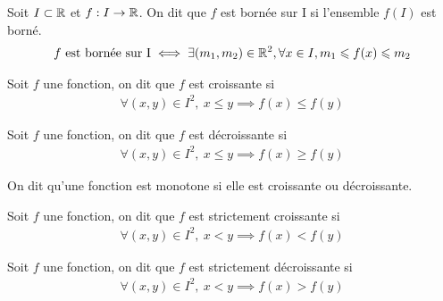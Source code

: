 \begin{graybox}
	\begin{definition}
		Soit $I \subset \mathbb{R}$ et $f:I\to \mathbb{R}$. 
		On dit que $f$ est bornée sur I si l'ensemble $f(I)$ est borné.
		\begin{align*}
			f \text{ est bornée sur I} \iff \exists (m_1, m_2) \in \mathbb{R}^2, \forall x \in I, m_1 \leqslant f(x) \leqslant m_2
		\end{align*}
	\end{definition}
\end{graybox}

\begin{graybox}
	\begin{definition}
		Soit $f$ une fonction, on dit que $f$ est croissante si 
		\begin{align*}
			\forall(x,y) \in I^2,\ x \leq y \implies f(x) \leq f(y)
		\end{align*}
	\end{definition}
\end{graybox}

\begin{graybox}
	\begin{definition}
		Soit $f$ une fonction, on dit que $f$ est décroissante si 
		\begin{align*}
			\forall(x,y) \in I^2,\ x \leq y \implies f(x) \geq f(y)
		\end{align*}
	\end{definition}
\end{graybox}

\begin{graybox}
	\begin{definition}
		On dit qu'une fonction est monotone si elle est croissante ou décroissante.
	\end{definition}
\end{graybox}

\begin{graybox}
	\begin{definition}
		Soit $f$ une fonction, on dit que $f$ est strictement croissante si 
		\begin{align*}
			\forall(x,y) \in I^2,\ x < y \implies f(x) < f(y)
		\end{align*}
	\end{definition}
\end{graybox}

\begin{graybox}
	\begin{definition}
		Soit $f$ une fonction, on dit que $f$ est strictement décroissante si 
		\begin{align*}
			\forall(x,y) \in I^2,\ x < y \implies f(x) > f(y)
		\end{align*}
	\end{definition}
\end{graybox}

